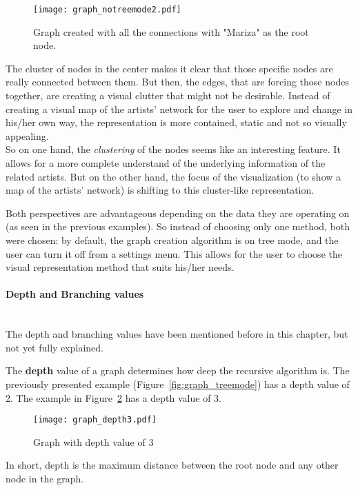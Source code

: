       \begin{figure}[tb]
        \begin{center}
          \texttt{[image: graph\_notreemode2.pdf]}
        \end{center}
        \caption{Graph created with all the connections with "Mariza" as the root node.}
        \label{fig:graph_notreemode2}
      \end{figure}

      The cluster of nodes in the center makes it clear that those specific nodes are really connected between them. 
      But then, the edges, that are forcing those nodes together, are creating a visual clutter that might not be desirable.
      Instead of creating a visual map of the artists' network for the user to  explore and change in his/her own way, the representation is more contained, static and not so visually appealing.
      \hfill \\

      So on one hand, the \emph{clustering} of the nodes seems like an interesting feature.
      It allows for a more complete understand of the underlying information of the related artists.
      But on the other hand, the focus of the visualization (to show a map of the artists' network) is shifting to this cluster-like representation.

      Both perspectives are advantageous depending on the data they are operating on (as seen in the previous examples).
      So instead of choosing only one method, both were chosen: by default, the graph creation algorithm is on tree mode, and the user can turn it off from a settings menu.
      This allows for the user to choose the visual representation method that suits his/her needs.

      \paragraph{Depth and Branching values} \hfill \\
      The depth and branching values have been mentioned before in this chapter, but not yet fully explained.

      The \textbf{depth} value of a graph determines how deep the recursive algorithm is.
      The previously presented example (Figure~\ref{fig:graph_treemode}) has a depth value of 2.
      The example in Figure~\ref{fig:graph_depth3} has a depth value of 3.
      \begin{figure}[hb]
        \begin{center}
          \texttt{[image: graph\_depth3.pdf]}
        \end{center}
        \caption{Graph with depth value of 3}
        \label{fig:graph_depth3}
      \end{figure}
      In short, depth is the maximum distance between the root node and any other node in the graph.

